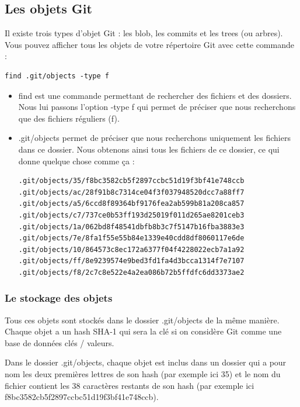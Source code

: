 \documentclass{article}
\begin{document}
\subsection{Les objets {\color{blue}Git}}
Il existe trois types d'objet {\color{blue}Git} : les blob, les commits et les trees (ou arbres). Vous pouvez afficher tous les objets de votre répertoire {\color{blue}Git} avec cette commande :

\begin{verbatim}
find .git/objects -type f
\end{verbatim}
\begin{itemize}
\item {\color{blue}find} est une commande permettant de rechercher des fichiers et des dossiers. Nous lui passons l'option {\color{blue}-type f} qui permet de préciser que nous recherchons que des fichiers réguliers ({\color{blue}f}).

\item {\color{blue}.git/objects} permet de préciser que nous recherchons uniquement les fichiers dans ce dossier. Nous obtenons ainsi tous les fichiers de ce dossier, ce qui donne quelque chose comme ça :
\begin{verbatim}
.git/objects/35/f8bc3582cb5f2897ccbc51d19f3bf41e748ccb
.git/objects/ac/28f91b8c7314ce04f3f037948520dcc7a88ff7
.git/objects/a5/6ccd8f89364bf9176fea2ab599b81a208ca857
.git/objects/c7/737ce0b53ff193d25019f011d265ae8201ceb3
.git/objects/1a/062bd8f48541dbfb8b3c7f5147b16fba3883e3
.git/objects/7e/8fa1f55e55b84e1339e40cdd8df8060117e6de
.git/objects/10/864573c8ec172a6377f04f4228022ecb7a1a92
.git/objects/ff/8e9239574e9bed3fd1fa4d3bcca1314f7e7107
.git/objects/f8/2c7c8e522e4a2ea086b72b5ffdfc6dd3373ae2
\end{verbatim}
\end{itemize}

\subsubsection*{Le stockage des objets}
Tous ces objets sont stockés dans le dossier {\color{blue}.git/objects} de la même manière. Chaque objet a un {\color{blue}hash} {\color{blue}SHA-1} qui sera la clé si on considère {\color{blue}Git} comme une base de données clés / valeurs.

Dans le dossier {\color{blue}.git/objects}, chaque objet est inclus dans un dossier qui a pour nom les deux premières lettres de son {\color{blue}hash} (par exemple ici {\color{blue}35}) et le nom du fichier contient les 38 caractères restants de son {\color{blue}hash} (par exemple ici {\color{blue}f8bc3582cb5f2897ccbc51d19f3bf41e748ccb)}.
\end{document}

